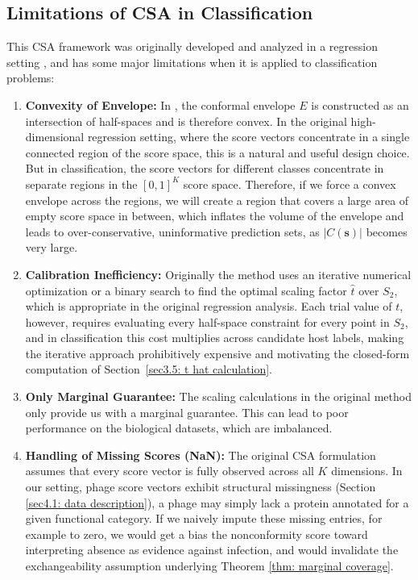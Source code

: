 \subsection{Limitations of CSA in Classification}
\label{sec2.4.3: csa limitations}
This CSA framework was originally developed and analyzed in a regression setting \cite{ochoarivera2024conformal}, 
and has some major limitations when it is applied to classification problems:
\begin{enumerate}[label=(\roman*)]
\item \textbf{Convexity of Envelope:} In \cite{ochoarivera2024conformal}, the conformal envelope $E$ is constructed 
      as an intersection of half-spaces and is therefore convex. In the original high-dimensional regression setting, 
      where the score vectors concentrate in a single connected region of the score space, this is a natural and useful 
      design choice. But in classification, the score vectors for different classes concentrate in separate regions in 
      the $[0, 1]^K$ score space. Therefore, if we force a convex envelope across the regions, we will create a region 
      that covers a large area of empty score space in between, which inflates the volume of the envelope and leads to 
      over-conservative, uninformative prediction sets, as $|C(\mathbf{s})|$ becomes very large.
\item \textbf{Calibration Inefficiency:} Originally the method uses an iterative numerical optimization or a binary search 
      to find the optimal scaling factor $\hat{t}$ over $S_2$, which is appropriate in the original regression analysis. 
      Each trial value of $t$, however, requires evaluating every half-space constraint for every point in $S_2$, and in 
      classification this cost multiplies across candidate host labels, making the iterative approach prohibitively 
      expensive and motivating the closed-form computation of Section~\ref{sec3.5: t hat calculation}.
\item \textbf{Only Marginal Guarantee:} The scaling calculations in the original method only provide us with a 
      marginal guarantee. This can lead to poor performance on the biological datasets, which are imbalanced.
\item \textbf{Handling of Missing Scores (NaN):} The original CSA formulation assumes that every score vector is fully 
      observed across all $K$ dimensions. In our setting, phage score vectors exhibit structural missingness (Section 
      \ref{sec4.1: data description}), a phage may simply lack a protein annotated for a given functional category. 
      If we naively impute these missing entries, for example to zero, we would get a bias the nonconformity score 
      toward interpreting absence as evidence against infection, and would invalidate the exchangeability assumption 
      underlying Theorem \ref{thm: marginal coverage}. 
\end{enumerate}

